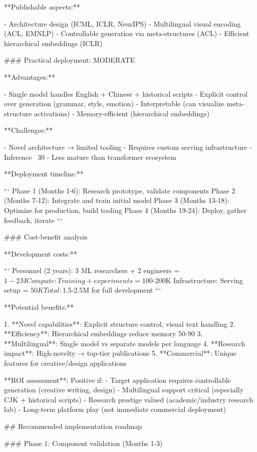\documentclass[11pt]{article}
\begin{document}
**Publishable aspects:**

- Architecture design (ICML, ICLR, NeurIPS)
- Multilingual visual encoding (ACL, EMNLP)
- Controllable generation via meta-structures (ACL)
- Efficient hierarchical embeddings (ICLR)

### Practical deployment: MODERATE

**Advantages:**

- Single model handles English + Chinese + historical scripts
- Explicit control over generation (grammar, style, emotion)
- Interpretable (can visualize meta-structure activations)
- Memory-efficient (hierarchical embeddings)

**Challenges:**

- Novel architecture → limited tooling
- Requires custom serving infrastructure
- Inference ~30%
- Less mature than transformer ecosystem

**Deployment timeline:**

```
Phase 1 (Months 1-6): Research prototype, validate components
Phase 2 (Months 7-12): Integrate and train initial model  
Phase 3 (Months 13-18): Optimize for production, build tooling
Phase 4 (Months 19-24): Deploy, gather feedback, iterate
```

### Cost-benefit analysis

**Development costs:**

```
Personnel (2 years): 3 ML researchers + 2 engineers = $1-2M
Compute: Training + experiments = $100-200K
Infrastructure: Serving setup = $50K
Total: $1.5-2.5M for full development
```

**Potential benefits:**

1. **Novel capabilities**: Explicit structure control, visual text handling
2. **Efficiency**: Hierarchical embeddings reduce memory 50-90%
3. **Multilingual**: Single model vs separate models per language
4. **Research impact**: High-novelty → top-tier publications
5. **Commercial**: Unique features for creative/design applications

**ROI assessment**: Positive if:
- Target application requires controllable generation (creative writing, design)
- Multilingual support critical (especially CJK + historical scripts)
- Research prestige valued (academic/industry research lab)
- Long-term platform play (not immediate commercial deployment)

## Recommended implementation roadmap

### Phase 1: Component validation (Months 1-3)
\end{document}
